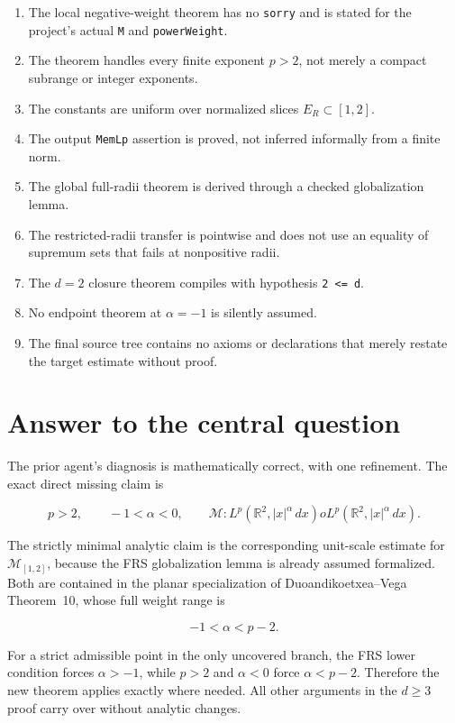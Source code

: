 \documentclass[11pt,a4paper]{article}
\theoremstyle{definition}
\theoremstyle{remark}
\newcommand{\R}{\mathbb{R}}
\newcommand{\M}{\mathcal{M}}
\newcommand{\abs}[1]{\left\lvert #1\right\rvert}
\newcommand{\lean}{\texttt}
\begin{document}
\begin{enumerate}[leftmargin=8mm]
\item The local negative-weight theorem has no \lean{sorry} and is stated for
      the project's actual \lean{M} and \lean{powerWeight}.
\item The theorem handles every finite exponent $p>2$, not merely a compact
      subrange or integer exponents.
\item The constants are uniform over normalized slices $E_R\subset[1,2]$.
\item The output \lean{MemLp} assertion is proved, not inferred informally from
      a finite norm.
\item The global full-radii theorem is derived through a checked globalization
      lemma.
\item The restricted-radii transfer is pointwise and does not use an equality
      of supremum sets that fails at nonpositive radii.
\item The $d=2$ closure theorem compiles with hypothesis \lean{2 <= d}.
\item No endpoint theorem at $\alpha=-1$ is silently assumed.
\item The final source tree contains no axioms or declarations that merely
      restate the target estimate without proof.
\end{enumerate}

\section{Answer to the central question}

The prior agent's diagnosis is mathematically correct, with one refinement.
The exact direct missing claim is

\[
p>2,
\qquad
-1<\alpha<0,
\qquad
\M:L^p(\R^2,\abs{x}^{\alpha}\,dx)	o
L^p(\R^2,\abs{x}^{\alpha}\,dx).
\]

The strictly minimal analytic claim is the corresponding unit-scale estimate
for $\M_{[1,2]}$, because the FRS globalization lemma is already assumed
formalized.  Both are contained in the planar specialization of
Duoandikoetxea--Vega Theorem~10, whose full weight range is

\[
-1<\alpha<p-2.
\]

For a strict admissible point in the only uncovered branch, the FRS lower
condition forces $\alpha>-1$, while $p>2$ and $\alpha<0$ force
$\alpha<p-2$.  Therefore the new theorem applies exactly where needed.  All
other arguments in the $d\geq3$ proof carry over without analytic changes.
\end{document}
